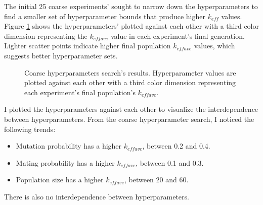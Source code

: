 The initial 25 coarse experiments' sought to narrow down the hyperparameters 
to find a smaller set of hyperparameter bounds that produce higher $k_{eff}$ values.
Figure \ref{fig:hyperparameter_sens} shows the hyperparameters' plotted against 
each other with a third color dimension representing the $k_{eff ave}$ 
value in each experiment's final generation. 
Lighter scatter points indicate higher final population $k_{eff ave}$ values, 
which suggests better hyperparameter sets. 
\begin{figure}[]
    \centering
    \caption{Coarse hyperparameters search's results. Hyperparameter values are plotted 
    against each other with a third color dimension representing each experiment's 
    final population's $k_{eff ave}$.}
    \label{fig:hyperparameter_sens}
\end{figure}
I plotted the hyperparameters against each other to visualize the interdependence 
between hyperparameters. 
From the coarse hyperparameter search, I noticed the following trends: 
\begin{itemize}
    \item Mutation probability has a higher $k_{eff ave}$, between 0.2 and 0.4. 
    \item Mating probability has a higher $k_{eff ave}$, between 0.1 and 0.3. 
    \item Population size has a higher $k_{eff ave}$, between 20 and 60. 
\end{itemize}
There is also no interdependence between hyperparameters. 

